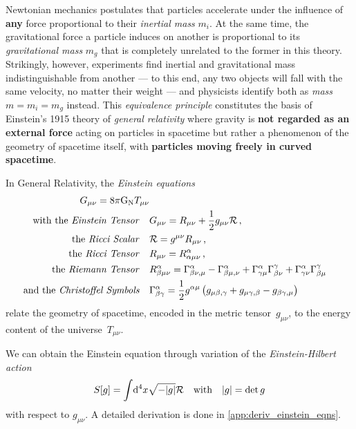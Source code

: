\documentclass[parskip=half]{scrreprt}
\begin{document}
Newtonian mechanics postulates that particles accelerate under the influence of \textbf{any} force proportional to their \emph{inertial mass} \(m_i\). At the same time, the gravitational force a particle induces on another is proportional to its \emph{gravitational mass} \(m_g\) that is completely unrelated to the former in this theory. Strikingly, however, experiments find inertial and gravitational mass indistinguishable from another  --- to this end, any two objects will fall with the same velocity, no matter their weight --- and physicists identify both as \emph{mass} \(m=m_i=m_g\) instead. This \emph{equivalence principle} constitutes the basis of Einstein's 1915 theory of \emph{general relativity} where gravity is \textbf{not regarded as an external force} acting on particles in spacetime but rather a phenomenon of the geometry of spacetime itself, with \textbf{particles moving freely in curved spacetime}.

In General Relativity, the \emph{Einstein equations}
\begin{align}\label{eq:einstein_eqns}
	\Gtens_{\mu \nu} = 8 \pi \Newtconst T_{\mu \nu} \\
	\textrm{with the \emph{Einstein Tensor}} \quad &\Gtens_{\mu \nu} = \Rtens_{\mu \nu} + \frac{1}{2}g_{\mu \nu}\Rscal \, \textrm{,} \\
	\textrm{the \emph{Ricci Scalar}} \quad &\Rscal = g^{\mu \nu}\Rtens_{\mu \nu} \, \textrm{,} \\
	\textrm{the \emph{Ricci Tensor}} \quad &\Rtens_{\mu \nu} = \Riemtens^\alpha_{\alpha \mu \nu} \, \textrm{,} \\
	\textrm{the \emph{Riemann Tensor}} \quad &\Riemtens^\alpha_{\beta \mu \nu} = \Gamma^\alpha_{\beta \nu, \mu} - \Gamma^\alpha_{\beta \mu, \nu} + \Gamma^\alpha_{\gamma \mu}\Gamma^\gamma_{\beta \nu} + \Gamma^\alpha_{\gamma \nu}\Gamma^\gamma_{\beta \mu} \\
	\textrm{and the \emph{Christoffel Symbols}} \quad &\Gamma^\alpha_{\beta \gamma} = \frac{1}{2} g^{\alpha \mu} \del{g_{\mu \beta, \gamma} + g_{\mu \gamma, \beta} - g_{\beta \gamma, \mu}}
\end{align}
relate the geometry of spacetime, encoded in the metric tensor~\(g_{\mu \nu}\), to the energy content of the universe~\(T_{\mu \nu}\). 

We can obtain the Einstein equation through variation of the \emph{Einstein-Hilbert action}
\begin{align}\label{eq:einstein_hilbert_action}
	S[g] = \int \! \dif{^4x} \sqrt{-\gdet} \Rscal \quad \textrm{with} \quad \gdet = \det{g}
\end{align}
with respect to \(g_{\mu \nu}\). A detailed derivation is done in \autoref{app:deriv_einstein_eqns}.
\end{document}

